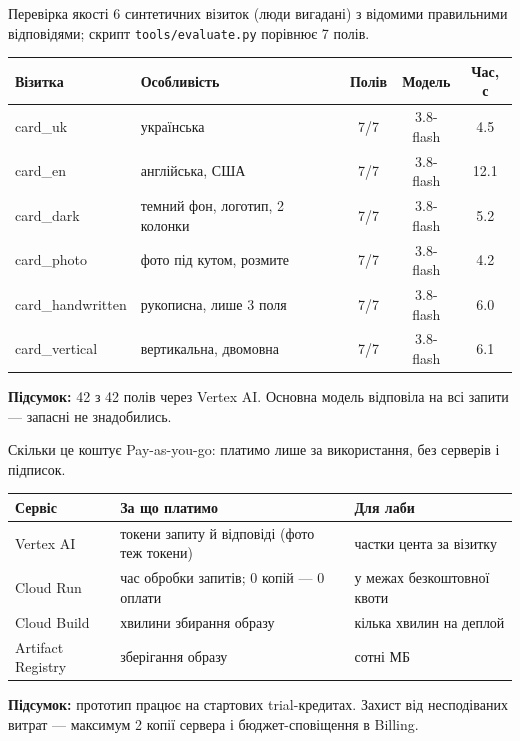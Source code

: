 \documentclass[aspectratio=169,11pt]{beamer}
\newcommand{\summary}[1]{\par\medskip\textbf{Підсумок:} #1}
\newcommand{\code}[1]{\texttt{#1}}
\begin{document}
\begin{frame}{Перевірка якості}
  6 синтетичних візиток (люди вигадані) з відомими правильними відповідями;
  скрипт \code{tools/evaluate.py} порівнює 7 полів.

  \medskip
  \centering
  \small
  \begin{tabular}{llccc}
    \toprule
    \textbf{Візитка} & \textbf{Особливість} & \textbf{Полів} & \textbf{Модель} & \textbf{Час, с} \\
    \midrule
    card\_uk & українська & 7/7 & 3.8-flash & 4.5 \\
    card\_en & англійська, США & 7/7 & 3.8-flash & 12.1 \\
    card\_dark & темний фон, логотип, 2 колонки & 7/7 & 3.8-flash & 5.2 \\
    card\_photo & фото під кутом, розмите & 7/7 & 3.8-flash & 4.2 \\
    card\_handwritten & рукописна, лише 3 поля & 7/7 & 3.8-flash & 6.0 \\
    card\_vertical & вертикальна, двомовна & 7/7 & 3.8-flash & 6.1 \\
    \bottomrule
  \end{tabular}
  \normalsize

  \raggedright
  \summary{42 з 42 полів через Vertex AI. Основна модель відповіла на всі запити ---
  запасні не знадобились.}
\end{frame}

\begin{frame}{Скільки це коштує}
  Pay-as-you-go: платимо лише за використання, без серверів і підписок.

  \medskip
  \centering
  \begin{tabular}{lL{0.36\textwidth}L{0.3\textwidth}}
    \toprule
    \textbf{Сервіс} & \textbf{За що платимо} & \textbf{Для лаби} \\
    \midrule
    Vertex AI & токени запиту й відповіді (фото теж токени) & частки цента за візитку \\
    Cloud Run & час обробки запитів; 0 копій --- 0 оплати & у межах безкоштовної квоти \\
    Cloud Build & хвилини збирання образу & кілька хвилин на деплой \\
    Artifact Registry & зберігання образу & сотні МБ \\
    \bottomrule
  \end{tabular}

  \raggedright
  \summary{прототип працює на стартових trial-кредитах. Захист від несподіваних витрат ---
  максимум 2 копії сервера і бюджет-сповіщення в Billing.}
\end{frame}
\end{document}
